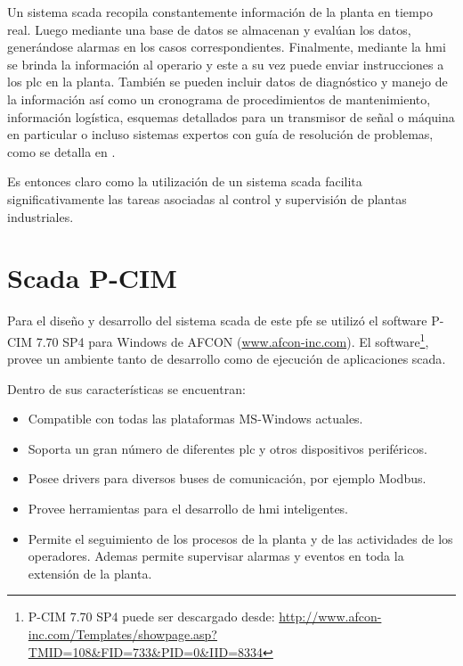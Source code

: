Un sistema \gls{scada} recopila constantemente información de la planta en 
tiempo real. Luego mediante una base de datos se almacenan y evalúan los datos, 
generándose alarmas en los casos correspondientes. Finalmente, mediante
la \gls{hmi} se brinda la información al operario y este a su vez puede enviar
instrucciones a los \gls{plc} en la planta. También se pueden incluir datos de 
diagnóstico y manejo de la información así como un cronograma de procedimientos 
de mantenimiento, información logística, esquemas detallados para un transmisor de señal o 
máquina en particular o incluso sistemas expertos con guía de resolución de 
problemas, como se detalla en \cite{bib:ManualScada}.

Es entonces claro como la utilización de un sistema \gls{scada} facilita 
significativamente las tareas asociadas al control y supervisión de plantas
industriales.

\section{Scada P-CIM}
\label{sec:ScadaPCIM} 
Para el diseño y desarrollo del sistema \gls{scada} de este \gls{pfe} se 
utilizó el software P-CIM 7.70 SP4 para Windows de AFCON 
(\url{www.afcon-inc.com}). El software\footnote{P-CIM 7.70 SP4 puede
ser descargado desde:
\url{
http://www.afcon-inc.com/Templates/showpage.asp?TMID=108&FID=733&PID=0&IID=8334}
}, provee un ambiente tanto de desarrollo
como de ejecución de aplicaciones \gls{scada}.

Dentro de sus características se encuentran:
\begin{itemize}
 \item Compatible con todas las plataformas MS-Windows actuales.
 \item Soporta un gran número de diferentes \gls{plc} y otros dispositivos 
  periféricos.
 \item Posee drivers para diversos buses de comunicación, por ejemplo Modbus.
 \item Provee herramientas para el desarrollo de \gls{hmi} inteligentes.
 \item Permite el seguimiento de los procesos de la planta y de las actividades
  de los operadores. Ademas permite supervisar alarmas y eventos en toda la
  extensión de la planta.
\end{itemize}

